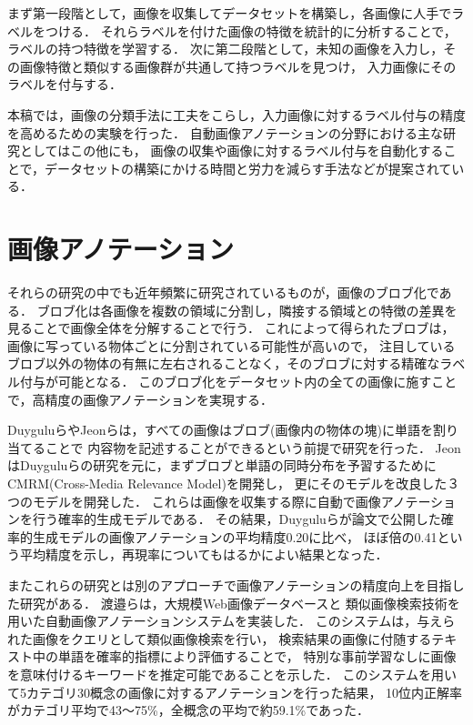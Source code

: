 まず第一段階として，画像を収集してデータセットを構築し，各画像に人手でラベルをつける．
それらラベルを付けた画像の特徴を統計的に分析することで，ラベルの持つ特徴を学習する．
次に第二段階として，未知の画像を入力し，その画像特徴と類似する画像群が共通して持つラベルを見つけ，
入力画像にそのラベルを付与する．

本稿では，画像の分類手法に工夫をこらし，入力画像に対するラベル付与の精度を高めるための実験を行った．
自動画像アノテーションの分野における主な研究としてはこの他にも，
画像の収集や画像に対するラベル付与を自動化することで，データセットの構築にかける時間と労力を減らす手法などが提案されている．


\section{画像アノテーション}



それらの研究の中でも近年頻繁に研究されているものが，画像のブロブ化である．
ブロブ化は各画像を複数の領域に分割し，隣接する領域との特徴の差異を見ることで画像全体を分解することで行う．
これによって得られたブロブは，画像に写っている物体ごとに分割されている可能性が高いので，
注目しているブロブ以外の物体の有無に左右されることなく，そのブロブに対する精確なラベル付与が可能となる．
このブロブ化をデータセット内の全ての画像に施すことで，高精度の画像アノテーションを実現する．

Duygulu\cite{duygulu}らやJeon\cite{jeon}らは，すべての画像はブロブ(画像内の物体の塊)に単語を割り当てることで
内容物を記述することができるという前提で研究を行った．
JeonはDuyguluらの研究を元に，まずブロブと単語の同時分布を予習するためにCMRM(Cross-Media Relevance Model)を開発し，
更にそのモデルを改良した３つのモデルを開発した．
これらは画像を収集する際に自動で画像アノテーションを行う確率的生成モデルである．
その結果，Duyguluらが論文で公開した確率的生成モデルの画像アノテーションの平均精度0.20に比べ，
ほぼ倍の0.41という平均精度を示し，再現率についてもはるかによい結果となった．

またこれらの研究とは別のアプローチで画像アノテーションの精度向上を目指した研究がある．
渡邉ら\cite{watanabe}は，大規模Web画像データベースと
類似画像検索技術を用いた自動画像アノテーションシステムを実装した．
このシステムは，与えられた画像をクエリとして類似画像検索を行い，
検索結果の画像に付随するテキスト中の単語を確率的指標により評価することで，
特別な事前学習なしに画像を意味付けるキーワードを推定可能であることを示した．
このシステムを用いて5カテゴリ30概念の画像に対するアノテーションを行った結果，
10位内正解率がカテゴリ平均で43～75\%，全概念の平均で約59.1\%であった．



